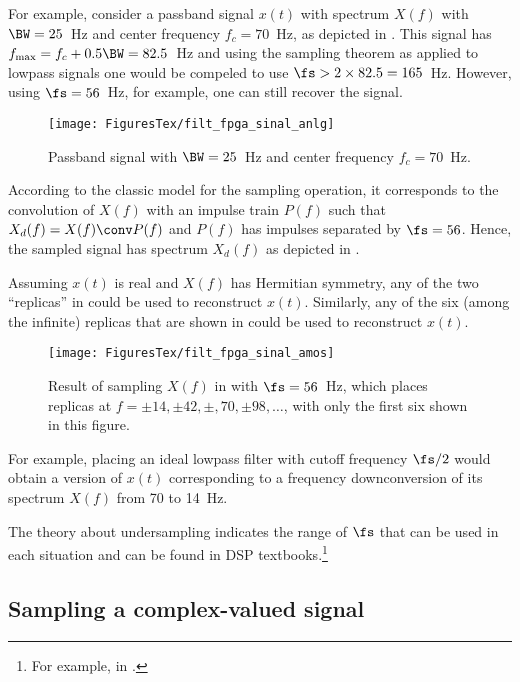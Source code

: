 For example, consider a passband signal $x(t)$ with spectrum $X(f)$ with $\BW=25$~Hz and center frequency $f_c=70$~Hz, as depicted in . This signal has $f_{\textrm{max}} = f_c + 0.5 \BW = 82.5$~Hz and using the sampling theorem as applied to lowpass signals one would be compeled to use $\fs > 2 \times  82.5 = 165$~Hz. However, using $\fs = 56$~Hz, for example, one can still recover the signal.

\begin{figure}[htbp]
\centering
\texttt{[image: FiguresTex/filt\_fpga\_sinal\_anlg]}
\caption{Passband signal with $\BW=25$~Hz and center frequency $f_c=70$~Hz.\label{fig:filt_fpga_sinal_anlg}}
\end{figure}

According to the classic model for the sampling operation, it corresponds to the convolution of $X(f)$ with an impulse train $P(f)$ such that $X_d(f) = X(f) \conv P(f)$ and $P(f)$ has impulses separated by $\fs = 56$. Hence, the sampled signal has spectrum $X_d(f)$ as depicted in . 

Assuming $x(t)$ is real and $X(f)$ has Hermitian symmetry, any of the two ``replicas''
in  could be used to reconstruct $x(t)$. Similarly, 
any of the six (among the infinite) replicas that are shown in  could be used to reconstruct $x(t)$.

\begin{figure}[htbp]
\centering
\texttt{[image: FiguresTex/filt\_fpga\_sinal\_amos]}
\caption[{Result of sampling $X(f)$ in  with $\fs=56$~Hz.}]{Result of sampling $X(f)$ in  with $\fs=56$~Hz, which places replicas at $f=\pm 14, \pm 42, \pm, 70, \pm 98, \ldots$, with only the first six shown in this figure.\label{fig:filt_fpga_sinal_amos}}
\end{figure}

For example, placing an ideal lowpass filter with cutoff frequency $\fs/2$ would obtain a version of $x(t)$ corresponding to a frequency downconversion of its spectrum $X(f)$ from 70 to 14~Hz.

The theory about undersampling indicates the range of $\fs$ that can be used in each situation and can be found in DSP textbooks.\footnote{For example, in \cite{Lyons10}.}

\subsection{Sampling a complex-valued signal}

